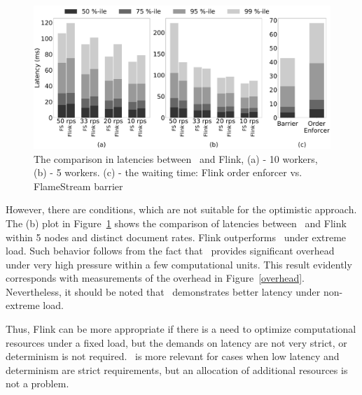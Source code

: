 \begin{figure}[ht]
  \centering
  \includegraphics[width=\textwidth]{pics/comp-index-quantiles}
  \caption{The comparison in latencies between \FlameStream\ and Flink, (a) - 10 workers, (b) - 5 workers. (c) - the waiting time: Flink order enforcer vs. FlameStream barrier}
  \label {fs-index-quantiles}
\end{figure}

However, there are conditions, which are not suitable for the optimistic approach. The (b) plot in Figure~\ref{fs-index-quantiles} shows the comparison of latencies between \FlameStream\ and Flink within 5 nodes and distinct document rates. Flink outperforms \FlameStream\ under extreme load. Such behavior follows from the fact that \FlameStream\ provides significant overhead under very high pressure within a few computational units. This result evidently corresponds with measurements of the overhead in Figure~\ref{overhead}. Nevertheless, it should be noted that \FlameStream\ demonstrates better latency under non-extreme load.

Thus, Flink can be more appropriate if there is a need to optimize computational resources under a fixed load, but the demands on latency are not very strict, or determinism is not required. \FlameStream\ is more relevant for cases when low latency and determinism are strict requirements, but an allocation of additional resources is not a problem.  


